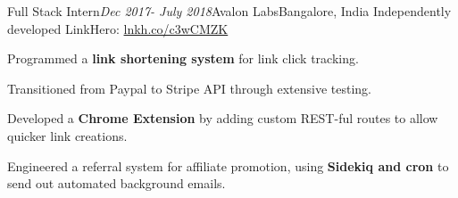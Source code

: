 \begin{rSubsection}{Full Stack Intern}{\em Dec 2017- July 2018}{Avalon Labs}{Bangalore, India}
    Independently developed LinkHero: \href{http://lnkh.co/c3wCMZK}{lnkh.co/c3wCMZK} 
    \item
    Programmed a \textbf{link shortening system} for link click tracking.
    \item 
    Transitioned from Paypal to Stripe API through extensive testing.
    \item
    Developed a \textbf{Chrome Extension} by adding custom REST-ful routes to allow quicker link creations.
    \item Engineered a referral system for affiliate promotion, using \textbf{Sidekiq and cron} to send out automated background emails.
\end{rSubsection}